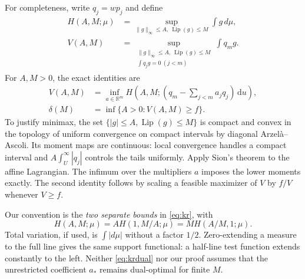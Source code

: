 \documentclass[11pt,a4paper]{article}
\numberwithin{equation}{section}
\theoremstyle{remark}\newtheorem{remark}[theorem]{Remark}
\DeclareMathOperator{\Lip}{Lip}
\newcommand{\R}{\mathbb R}
\newcommand{\dd}{\,\mathrm du}
\newcommand{\norm}[1]{\lVert#1\rVert}
\begin{document}
For completeness, write $q_j=wp_j$ and define
\begin{align}
 H(A,M;\mu)&=\sup_{\norm g_\infty\le A,\ \Lip(g)\le M}\int g\,d\mu,\label{eq:kr}\\
 V(A,M)&=\sup_{\substack{\norm g_\infty\le A,\ \Lip(g)\le M\\
                         \int q_jg=0\ (j<m)}}\int q_mg.
\end{align}
For $A,M>0$, the exact identities are
\begin{equation}
 \begin{aligned}
 V(A,M)&=\inf_{a\in\R^m}H\left(A,M;(q_m-\textstyle\sum_{j<m}a_jq_j)\dd\right),\\
 \delta(M)&=\inf\{A>0:V(A,M)\ge f\}.
 \end{aligned}\label{eq:krdual}
\end{equation}
To justify minimax, the set $\{|g|\le A,\Lip(g)\le M\}$ is compact and
convex in the topology of uniform convergence on compact intervals by
diagonal Arzel\`a--Ascoli. Its moment maps are continuous: local convergence
handles a compact interval and $A\int_U^\infty|q_j|$ controls the tails
uniformly. Apply Sion's theorem \cite{sion} to the affine Lagrangian.
The infimum over the multipliers $a$ imposes the lower moments exactly.
The second identity follows by scaling a feasible maximizer of $V$ by
$f/V$ whenever $V\ge f$.

Our convention is the \emph{two separate bounds} in \eqref{eq:kr}, with
\begin{equation}
 H(A,M;\mu)=A H(1,M/A;\mu)=M H(A/M,1;\mu).\label{eq:normalization}
\end{equation}
Total variation, if used, is $\int|d\mu|$ without a factor $1/2$.
Zero-extending a measure to the full line gives the same support
functional: a half-line test function extends constantly to the left.
Neither \eqref{eq:krdual} nor our proof assumes that the unrestricted
coefficient $a_*$ remains dual-optimal for finite $M$.
\end{document}
